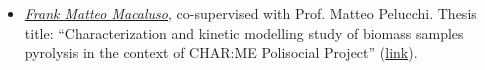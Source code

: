 
\begin{itemize}
   \item [ ] \ul{\it Frank Matteo Macaluso}, co-supervised with Prof. Matteo Pelucchi. Thesis title: ``Characterization and kinetic modelling study of biomass samples pyrolysis in the context of CHAR:ME Polisocial Project'' (\href{https://hdl.handle.net/10589/215858}{link}).
\end{itemize}
